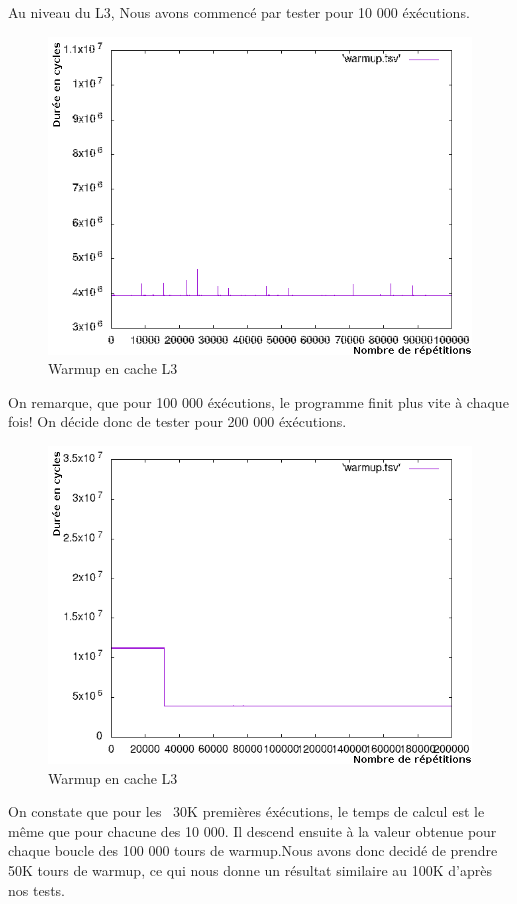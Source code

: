 \documentclass[a4paper]{report}
\begin{document}
Au niveau du L3, Nous avons commencé par tester pour 10 000 éxécutions. 

\newpage 
    \begin{figure}[ht!]
        \centering
        \includegraphics[width=120mm]{MEDIA/warmupL3_100000.png}
        \caption{Warmup en cache L3 }
    \end{figure}

On remarque, que pour 100 000 éxécutions, le programme finit plus vite à chaque fois!
On décide donc de tester pour 200 000 éxécutions.

\newpage
    \begin{figure}[ht!]
        \centering
        \includegraphics[width=120mm]{MEDIA/warmupL3_200000.png}
        \caption{Warmup en cache L3 }
    \end{figure}

    On constate que pour les ~30K premières éxécutions, le temps de calcul est le même que pour chacune des 10 000. Il descend ensuite à la valeur obtenue pour chaque boucle des 100 000 tours de warmup.Nous avons donc decidé de prendre 50K tours de warmup, ce qui nous donne un résultat similaire au 100K d'après nos tests.
   \newpage
\end{document}

